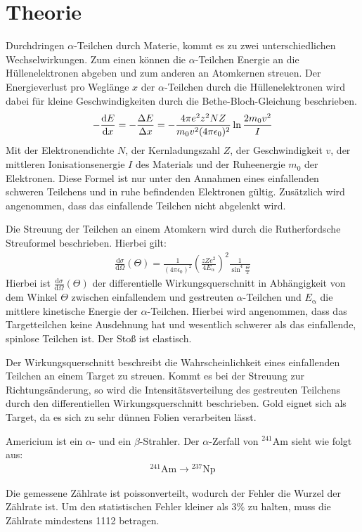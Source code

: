 \section{Theorie}
\label{sec:Theorie}

Durchdringen $\alpha$-Teilchen durch Materie, kommt es zu zwei unterschiedlichen Wechselwirkungen.
Zum einen können die $\alpha$-Teilchen Energie an die Hüllenelektronen abgeben und zum anderen
an Atomkernen streuen. Der Energieverlust pro Weglänge $x$ der $\alpha$-Teilchen durch die Hüllenelektronen wird dabei für
kleine Geschwindigkeiten durch die
Bethe-Bloch-Gleichung beschrieben.
\begin{align}
  -\frac{\mathrm{d}E}{\mathrm{d}x} =-\frac{\Delta E}{\Delta x}= - \frac{4\pi e^2 z^2 N Z}{m_{\mathrm{0}}v^2(4 \pi \epsilon_{\mathrm{0}})^2} \ln{\frac{2 m_{\mathrm{0}} v^2}{I}} \text{\label{eqn:bethe}}
\end{align}
Mit der Elektronendichte $N$, der Kernladungszahl $Z$, der Geschwindigkeit $v$, der mittleren Ionisationsenergie $I$ des Materials
und der Ruheenergie $m_{\mathrm{0}}$ der Elektronen. Diese Formel ist nur unter den Annahmen eines einfallenden
schweren Teilchens und in ruhe befindenden Elektronen gültig. Zusätzlich wird angenommen, dass das einfallende Teilchen nicht
abgelenkt wird.

Die Streuung der Teilchen an einem Atomkern wird durch die Rutherfordsche Streuformel beschrieben. Hierbei gilt:
\begin{align}
  \frac{\mathrm{d}\sigma}{\mathrm{d}\Omega}(\Theta) = \frac{1}{(4 \pi \epsilon_{\mathrm{0}})^2} \left(\frac{z Z e^2}{4 E_{\mathrm{\alpha}}}\right)^2 \frac{1}{\sin^4{\frac{\Theta}{2}}}
  \label{eqn:rutherford}
\end{align}
Hierbei ist $\frac{\mathrm{d}\sigma}{\mathrm{d}\Omega}(\Theta)$ der differentielle Wirkungsquerschnitt in Abhängigkeit von dem Winkel $\Theta$
zwischen einfallendem und gestreuten $\alpha$-Teilchen und
$E_{\mathrm{\alpha}}$ die mittlere kinetische Energie der $\alpha$-Teilchen.
Hierbei wird angenommen, dass das Targetteilchen keine Ausdehnung hat und wesentlich schwerer
als das einfallende, spinlose Teilchen ist. Der Stoß ist elastisch.

Der Wirkungsquerschnitt beschreibt die Wahrscheinlichkeit eines einfallenden Teilchen an
einem Target zu streuen. Kommt es bei der Streuung zur Richtungsänderung, so wird
die Intensitätsverteilung des gestreuten Teilchens durch den differentiellen Wirkungsquerschnitt
beschrieben. Gold eignet sich als Target, da es sich zu sehr dünnen Folien verarbeiten lässt.

Americium ist ein $\alpha$- und ein $\beta$-Strahler. Der $\alpha$-Zerfall von ${}^{241}\mathrm{Am}$ sieht wie folgt aus:
\begin{align*}
  {}^{241}\mathrm{Am} \rightarrow {}^{237}\mathrm{Np}
\end{align*}

Die gemessene Zählrate ist poissonverteilt, wodurch der Fehler die Wurzel der Zählrate ist. Um den
statistischen Fehler kleiner als $3\%$ zu halten, muss die Zählrate mindestens 1112 betragen.
